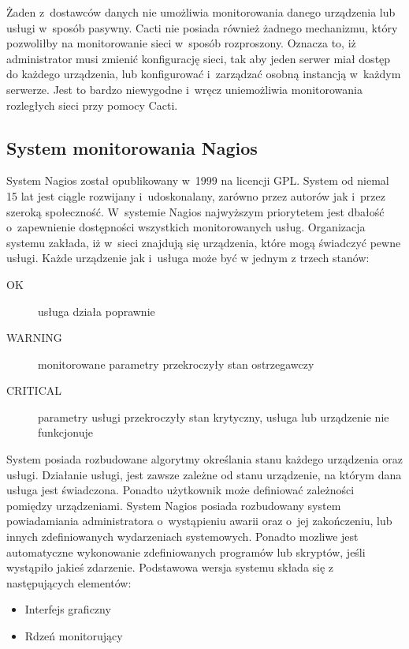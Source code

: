 Żaden z~dostawców danych nie umożliwia monitorowania danego urządzenia
lub usługi w~sposób pasywny. Cacti nie posiada również żadnego
mechanizmu, który pozwoliłby na monitorowanie sieci w~sposób
rozproszony. Oznacza to, iż administrator musi zmienić konfigurację
sieci, tak aby jeden serwer miał dostęp do każdego urządzenia, lub
konfigurować i~zarządzać osobną instancją w~każdym serwerze. Jest to
bardzo niewygodne i~wręcz uniemożliwia monitorowania rozległych sieci
przy pomocy Cacti.

\subsection[Nagios][System monitorowania Nagios]{System monitorowania Nagios}

System Nagios został opublikowany w~1999 na licencji GPL. System od
niemal 15 lat jest ciągle rozwijany i~udoskonalany, zarówno przez
autorów jak i~przez szeroką społeczność. W~systemie Nagios najwyższym
priorytetem jest dbałość o~zapewnienie dostępności wszystkich
monitorowanych usług. Organizacja systemu zakłada, iż w~sieci znajdują
się urządzenia, które mogą świadczyć pewne usługi. Każde urządzenie
jak i~usługa może być w jednym z trzech stanów:

\begin{description}
\item[OK] usługa działa poprawnie
\item[WARNING] monitorowane parametry przekroczyły stan ostrzegawczy
\item[CRITICAL] parametry usługi przekroczyły stan krytyczny, usługa
  lub urządzenie nie funkcjonuje
\end{description}

System posiada rozbudowane algorytmy określania stanu każdego
urządzenia oraz usługi. Działanie usługi, jest zawsze zależne od stanu
urządzenie, na którym dana usługa jest świadczona. Ponadto użytkownik
może definiować zależności pomiędzy urządzeniami. System Nagios
posiada rozbudowany system powiadamiania administratora o~wystąpieniu
awarii oraz o~jej zakończeniu, lub innych zdefiniowanych wydarzeniach
systemowych. Ponadto mozliwe jest automatyczne wykonowanie
zdefiniowanych programów lub skryptów, jeśli wystąpiło jakieś
zdarzenie. Podstawowa wersja systemu składa się z następujących
elementów:

\begin{itemize}
\item Interfejs graficzny
\item Rdzeń monitorujący
\end{itemize}

